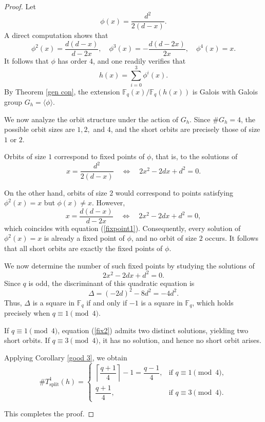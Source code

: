 \documentclass[1p,final]{elsarticle}
\newtheorem{open problem}[theorem]{Open Problem}
\begin{document}
\begin{proof}

Let
\[
\phi(x)=\frac{d^2}{2(d-x)}.
\]
A direct computation shows that
\[
\phi^2(x)=\frac{d(d-x)}{d-2x}, \quad 
\phi^3(x)=-\frac{d(d-2x)}{2x}, \quad 
\phi^4(x)=x.
\]
It follows that $\phi$ has order $4$, and one readily verifies that
\[
h(x)=\sum_{i=0}^{3}\phi^{i}(x).
\]
By Theorem \ref{gen con}, the extension $\mathbb{F}_{q}(x)/\mathbb{F}_{q}(h(x))$ is Galois with Galois group $G_h=\langle \phi \rangle$.

\medskip

We now analyze the orbit structure under the action of $G_h$. Since $\#G_h=4$, the possible orbit sizes are $1,2,$ and $4$, and the short orbits are precisely those of size $1$ or $2$.

Orbits of size $1$ correspond to fixed points of $\phi$, that is, to the solutions of
\begin{equation}\label{fixpoint1}
x = \frac{d^2}{2(d-x)} \quad \Longleftrightarrow \quad 2x^2 - 2dx + d^2 = 0.
\end{equation}

On the other hand, orbits of size $2$ would correspond to points satisfying $\phi^2(x)=x$ but $\phi(x)\ne x$. However,
\begin{equation}\label{fixpoint2}
x = \frac{d(d-x)}{d-2x} \quad \Longleftrightarrow \quad 2x^2 - 2dx + d^2 = 0,
\end{equation}
which coincides with equation (\ref{fixpoint1}). Consequently, every solution of $\phi^2(x)=x$ is already a fixed point of $\phi$, and no orbit of size $2$ occurs. It follows that all short orbits are exactly the fixed points of $\phi$.

\medskip

We now determine the number of such fixed points by studying the solutions of
\begin{equation}\label{fix2}
2x^2 - 2dx + d^2 = 0.
\end{equation}
Since $q$ is odd, the discriminant of this quadratic equation is
\[
\Delta = (-2d)^2 - 8d^2 = -4d^2.
\]
Thus, $\Delta$ is a square in $\mathbb{F}_q$ if and only if $-1$ is a square in $\mathbb{F}_q$, which holds precisely when $q\equiv 1 \pmod{4}$.

If $q\equiv 1 \pmod{4}$, equation (\ref{fix2}) admits two distinct solutions, yielding two short orbits. If $q\equiv 3 \pmod{4}$, it has no solution, and hence no short orbit arises.

\medskip

Applying Corollary \ref{good 3}, we obtain
\[
\# T_{\text{split}}^1(h) =
\begin{cases}
\left\lceil \dfrac{q+1}{4} \right\rceil -1 = \dfrac{q-1}{4}, & \text{if } q\equiv 1 \pmod{4}, \\[2ex]
\dfrac{q+1}{4}, & \text{if } q\equiv 3 \pmod{4}.
\end{cases}
\]

This completes the proof.

\end{proof}
\end{document}

